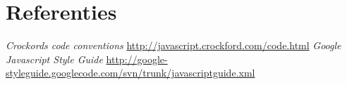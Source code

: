 \section{Referenties}

\begin{thebibliography}{2}
 \emph{Crockords code conventions} \url{http://javascript.crockford.com/code.html}
 \emph{Google Javascript Style Guide} \url{http://google-styleguide.googlecode.com/svn/trunk/javascriptguide.xml}
\end{thebibliography}
